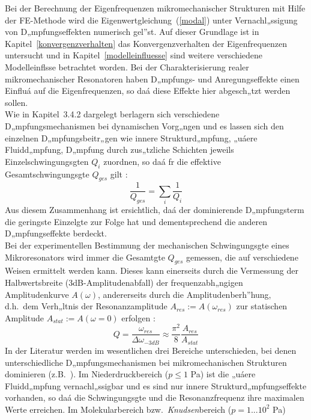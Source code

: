 Bei der Berechnung der Eigenfrequenzen mikromechanischer Strukturen
mit Hilfe der FE-Methode wird die Eigenwertgleichung~(\ref{modal})
unter Vernachl„ssigung von D„mpfungseffekten numerisch gel”st. Auf dieser
Grundlage ist in Kapitel~\ref{konvergenzverhalten} das Konvergenzverhalten
der Eigenfrequenzen untersucht und in Kapitel~\ref{modelleinfluesse} sind
weitere verschiedene Modelleinflsse betrachtet worden. Bei der
Charakterisierung realer mikromechanischer Resonatoren haben D„mpfungs- und
Anregungseffekte einen Einfluá auf die Eigenfrequenzen, so daá diese
Effekte hier abgesch„tzt werden sollen.\\
%
Wie in Kapitel~3.4.2 dargelegt berlagern sich verschiedene
D„mpfungsmechanismen bei dynamischen Vorg„ngen und es lassen sich den
einzelnen D„mpfungsbeitr„gen wie innere Strukturd„mpfung, „uáere
Fluidd„mpfung, D„mpfung durch zus„tzliche Schichten jeweils
Einzelschwingungsgten $Q_{i}$ zuordnen, so daá fr die effektive
Gesamtschwingungsgte $Q_{ges}$ gilt \cite{Til92}:
\begin{equation}
\label{qsum}
 \frac{1}{Q_{ges}} = \sum_{i} \frac{1}{Q_{i}}
\end{equation}
Aus diesem Zusammenhang ist ersichtlich, daá der dominierende D„mpfungsterm
die geringste Einzelgte zur Folge hat und dementsprechend die anderen
D„mpfungseffekte berdeckt.\\
%
Bei der experimentellen Bestimmung der mechanischen Schwingungsgte eines
Mikroresonators wird immer die Gesamtgte $Q_{ges}$ gemessen, die auf
verschiedene Weisen ermittelt werden kann. Dieses kann einerseits durch die
Vermessung der Halbwertsbreite (3dB-Amplitudenabfall) der frequenzabh„ngigen
Amplitudenkurve $A(\omega)$, andererseits durch die Amplitudenberh”hung,
d.h.\ dem Verh„ltnis der Resonanzamplitude $A_{res} := A(\omega_{res})$
zur statischen Amplitude $A_{stat} := A(\omega=0)$ erfolgen
\cite{VIB}:
\begin{equation}
\label{qmess}
 Q = \frac{\omega_{res}}{\Delta \omega_{-3dB}}
    \approx \frac{\pi^2}{8} \frac{A_{res}}{A_{stat}}
\end{equation}
%
In der Literatur werden im wesentlichen drei Bereiche unterschieden, bei
denen unterschiedliche D„mpfungsmechanismen bei mikromechanischen Strukturen
dominieren (z.B.\ \cite{Blo92}). Im Niederdruckbereich ($p \leq 1$ Pa)
ist die „uáere Fluidd„mpfung vernachl„ssigbar und es sind nur innere
Strukturd„mpfungseffekte vorhanden, so daá die Schwingungsgte und die
Resonanzfrequenz ihre maximalen Werte erreichen.
Im Molekularbereich bzw.\ {\sl Knudsen}bereich ($p=1...10^2$ Pa)
